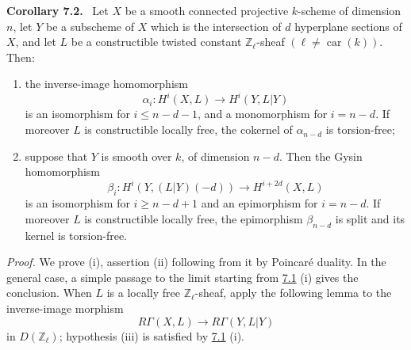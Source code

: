\documentclass[11pt]{article}
\newenvironment{statement}[1]{\par\medskip\noindent\textbf{#1.}\ }{\par\medskip}
\begin{document}
\label{sga5:VII:corollary:7.2}\begin{statement}{Corollary 7.2}
Let $X$ be a smooth connected projective $k$-scheme of dimension $n$, let $Y$ be a subscheme of $X$ which is the intersection of $d$ hyperplane sections of $X$, and let $L$ be a constructible twisted constant $\mathbb Z_\ell$-sheaf $(\ell\ne\operatorname{car}(k))$. Then:
\begin{enumerate}[label=(\roman*)]
\item the inverse-image homomorphism
\[
\alpha_i:H^i(X,L)\to H^i(Y,L|Y)
\]
is an isomorphism for $i\le n-d-1$, and a monomorphism for $i=n-d$. If moreover $L$ is constructible locally free, the cokernel of $\alpha_{n-d}$ is torsion-free;
\item suppose that $Y$ is smooth over $k$, of dimension $n-d$. Then the Gysin homomorphism
\[
\beta_i:H^i(Y,(L|Y)(-d))\to H^{i+2d}(X,L)
\]
is an isomorphism for $i\ge n-d+1$ and an epimorphism for $i=n-d$. If moreover $L$ is constructible locally free, the epimorphism $\beta_{n-d}$ is split and its kernel is torsion-free.
\end{enumerate}
\end{statement}

\emph{Proof.} We prove (i), assertion (ii) following from it by Poincaré duality. In the general case, a simple passage to the limit starting from \hyperref[sga5:VII:theorem:7.1]{7.1} (i) gives the conclusion. When $L$ is a locally free $\mathbb Z_\ell$-sheaf, apply the following lemma to the inverse-image morphism
\[
R\Gamma(X,L)\to R\Gamma(Y,L|Y)
\]
in $D(\mathbb Z_\ell)$; hypothesis (iii) is satisfied by \hyperref[sga5:VII:theorem:7.1]{7.1} (i).
\end{document}
